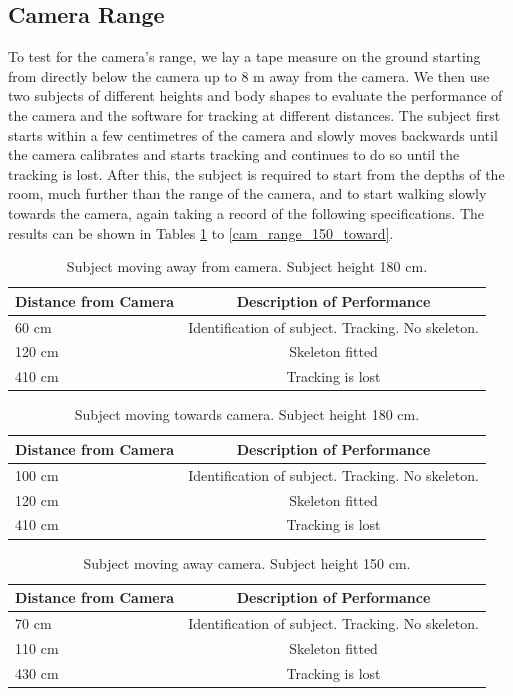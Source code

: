 \documentclass[11pt,a4paper]{article}
\begin{document}
\subsection{Camera Range}
\noindent 
To test for the camera's range, we lay a tape measure on the ground starting from directly below the camera up to 8 m away from the camera. We then use two subjects of different heights and body shapes to evaluate the performance of the camera and the software for tracking at different distances. The subject first starts within a few centimetres of the camera and slowly moves backwards until the camera calibrates and starts tracking and continues to do so until the tracking is lost. After this, the subject is required to start from the depths of the room, much further than the range of the camera, and to start walking slowly towards the camera, again taking a record of the following specifications. The results can be shown in Tables \ref{cam_range_180_away} to \ref{cam_range_150_toward}.
\\
\begin{table}[H]
\center
\begin{tabular}{ | l | c |}
\hline
Distance from Camera & Description of Performance \\
\hline
60 cm & Identification of subject. Tracking. No skeleton.\\
120 cm & Skeleton fitted\\
410 cm & Tracking is lost\\
\hline
\end{tabular}
\caption{Subject moving away from camera. Subject height 180 cm.}
\label{cam_range_180_away}
\end{table}

\begin{table}[H]
\center
\begin{tabular}{ | l | c |}
\hline
Distance from Camera & Description of Performance \\
\hline
100 cm & Identification of subject. Tracking. No skeleton.\\
120 cm & Skeleton fitted\\
410 cm & Tracking is lost\\
\hline
\end{tabular}
\caption{Subject moving towards camera. Subject height 180 cm.}
\label{cam_range_180_toward}
\end{table}

\begin{table}[H]
\center
\begin{tabular}{ | l | c |}
\hline
Distance from Camera & Description of Performance \\
\hline
70 cm & Identification of subject. Tracking. No skeleton.\\
110 cm & Skeleton fitted\\
430 cm & Tracking is lost\\
\hline
\end{tabular}
\caption{Subject moving away camera. Subject height 150 cm.}
\label{cam_range_150_away}
\end{table}
\end{document}
